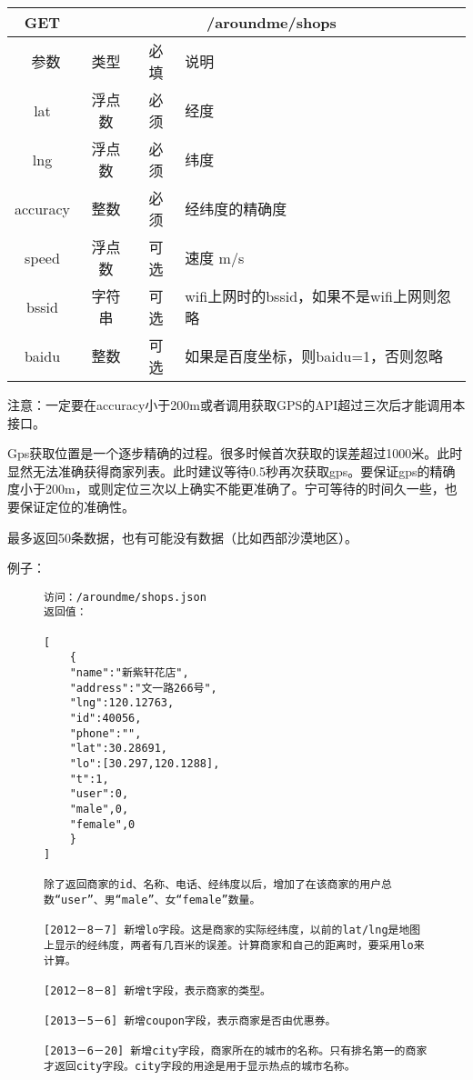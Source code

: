 \documentclass[cs4size]{ctexartutf8}
\begin{document}
\begin{table}[H]
   \begin{center}
\begin{tabular}{|c|c|c|p{12cm}|}
\hline
GET & \multicolumn{3}{|c|}{/aroundme/shops} \\
\hline\hline
 \  参数  & 类型 & 必填 &  说明  \\
\hline
 lat  & 浮点数 & 必须 & 经度\\
\hline
 lng  &  浮点数 & 必须 & 纬度\\ 
\hline
 accuracy  & 整数 & 必须 & 经纬度的精确度\\ 
\hline
 speed  & 浮点数 & 可选 & 速度 m/s\\   
\hline
 bssid  & 字符串 & 可选 & wifi上网时的bssid，如果不是wifi上网则忽略\\  
\hline
 baidu  & 整数 & 可选 & 如果是百度坐标，则baidu=1，否则忽略\\  
\hline
\end{tabular}
   \end{center}
\end{table}

注意：一定要在accuracy小于200m或者调用获取GPS的API超过三次后才能调用本接口。

Gps获取位置是一个逐步精确的过程。很多时候首次获取的误差超过1000米。此时显然无法准确获得商家列表。此时建议等待0.5秒再次获取gps。要保证gps的精确度小于200m，或则定位三次以上确实不能更准确了。宁可等待的时间久一些，也要保证定位的准确性。

最多返回50条数据，也有可能没有数据（比如西部沙漠地区）。

例子：

\begin{figure}[H]
\begin{verbatim}
访问：/aroundme/shops.json
返回值：

[
	{
	"name":"新紫轩花店",
	"address":"文一路266号",
	"lng":120.12763,
	"id":40056,
	"phone":"",
	"lat":30.28691,
	"lo":[30.297,120.1288],
	"t":1,
	"user":0,
	"male",0,
	"female",0
	}
]

除了返回商家的id、名称、电话、经纬度以后，增加了在该商家的用户总数“user”、男“male”、女“female”数量。

[2012－8－7] 新增lo字段。这是商家的实际经纬度，以前的lat/lng是地图上显示的经纬度，两者有几百米的误差。计算商家和自己的距离时，要采用lo来计算。

[2012－8－8] 新增t字段，表示商家的类型。

[2013－5－6] 新增coupon字段，表示商家是否由优惠券。

[2013－6－20] 新增city字段，商家所在的城市的名称。只有排名第一的商家才返回city字段。city字段的用途是用于显示热点的城市名称。


\end{verbatim}
\end{figure}
\end{document}
